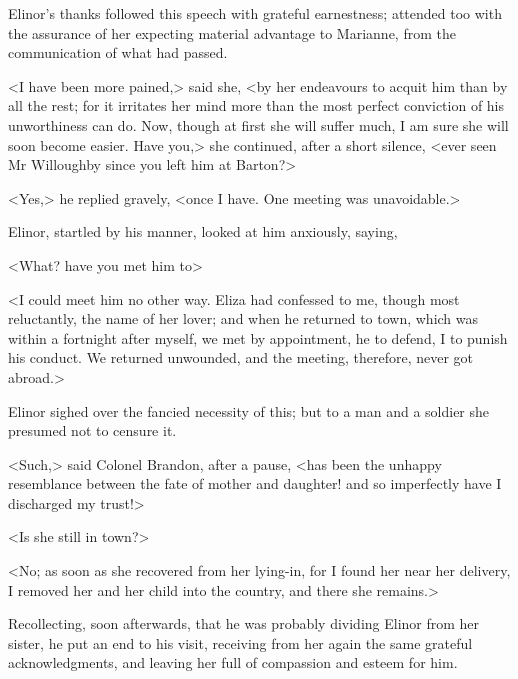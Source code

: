 Elinor's thanks followed this speech with grateful earnestness; attended too with the assurance of her expecting material advantage to Marianne, from the communication of what had passed.

<I have been more pained,> said she, <by her endeavours to acquit him than by all the rest; for it irritates her mind more than the most perfect conviction of his unworthiness can do. Now, though at first she will suffer much, I am sure she will soon become easier. Have you,> she continued, after a short silence, <ever seen Mr Willoughby since you left him at Barton?>

<Yes,> he replied gravely, <once I have. One meeting was unavoidable.>

Elinor, startled by his manner, looked at him anxiously, saying,

<What? have you met him to\longdash>

<I could meet him no other way. Eliza had confessed to me, though most reluctantly, the name of her lover; and when he returned to town, which was within a fortnight after myself, we met by appointment, he to defend, I to punish his conduct. We returned unwounded, and the meeting, therefore, never got abroad.>

Elinor sighed over the fancied necessity of this; but to a man and a soldier she presumed not to censure it.

<Such,> said Colonel Brandon, after a pause, <has been the unhappy resemblance between the fate of mother and daughter! and so imperfectly have I discharged my trust!>

<Is she still in town?>

<No; as soon as she recovered from her lying-in, for I found her near her delivery, I removed her and her child into the country, and there she remains.>

Recollecting, soon afterwards, that he was probably dividing Elinor from her sister, he put an end to his visit, receiving from her again the same grateful acknowledgments, and leaving her full of compassion and esteem for him.